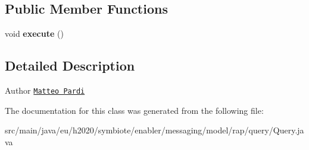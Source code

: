 \subsection*{Public Member Functions}
\begin{DoxyCompactItemize}
\item 
\mbox{\label{classeu_1_1h2020_1_1symbiote_1_1enabler_1_1messaging_1_1model_1_1rap_1_1query_1_1Query_a65d1988991afffedb53e7761ca74c661}} 
void {\bfseries execute} ()
\end{DoxyCompactItemize}


\subsection{Detailed Description}
\begin{DoxyAuthor}{Author}
\href{mailto:m.pardi@nextworks.it}{\tt Matteo Pardi} 
\end{DoxyAuthor}


The documentation for this class was generated from the following file\+:\begin{DoxyCompactItemize}
\item 
src/main/java/eu/h2020/symbiote/enabler/messaging/model/rap/query/Query.\+java\end{DoxyCompactItemize}
